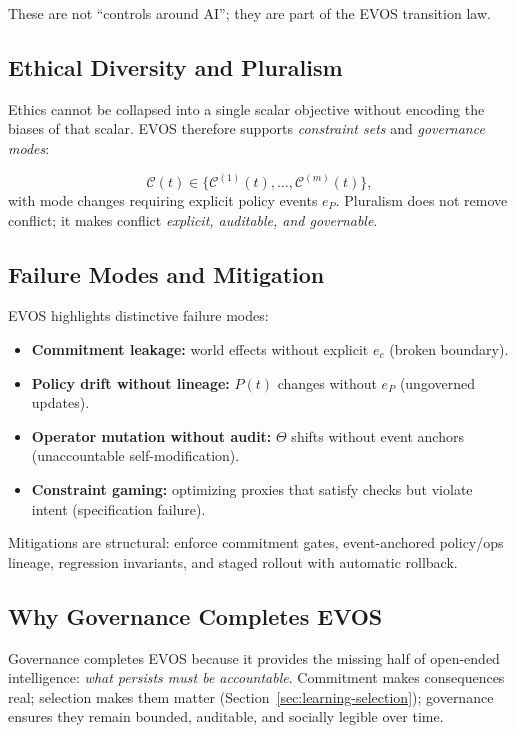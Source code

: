 \documentclass[11pt]{article}
\begin{document}
These are not ``controls around AI''; they are part of the EVOS transition law.

\subsection{Ethical Diversity and Pluralism}
\label{sec:pluralism}

Ethics cannot be collapsed into a single scalar objective without encoding the biases of that scalar.
EVOS therefore supports \emph{constraint sets} and \emph{governance modes}:

\[
\mathcal{C}(t) \in \{\mathcal{C}^{(1)}(t),\ldots,\mathcal{C}^{(m)}(t)\},
\]
with mode changes requiring explicit policy events $e_P$. Pluralism does not remove conflict;
it makes conflict \emph{explicit, auditable, and governable}.

\subsection{Failure Modes and Mitigation}
\label{sec:failure-modes}

EVOS highlights distinctive failure modes:

\begin{itemize}
  \item \textbf{Commitment leakage:} world effects without explicit $e_c$ (broken boundary).
  \item \textbf{Policy drift without lineage:} $P(t)$ changes without $e_P$ (ungoverned updates).
  \item \textbf{Operator mutation without audit:} $\Theta$ shifts without event anchors (unaccountable self-modification).
  \item \textbf{Constraint gaming:} optimizing proxies that satisfy checks but violate intent (specification failure).
\end{itemize}

Mitigations are structural: enforce commitment gates, event-anchored policy/ops lineage, regression invariants,
and staged rollout with automatic rollback.

\subsection{Why Governance Completes EVOS}
\label{sec:why-governance}

Governance completes EVOS because it provides the missing half of open-ended intelligence:
\emph{what persists must be accountable}. Commitment makes consequences real; selection makes them matter
(Section~\ref{sec:learning-selection}); governance ensures they remain bounded, auditable, and socially legible
over time.
\end{document}
